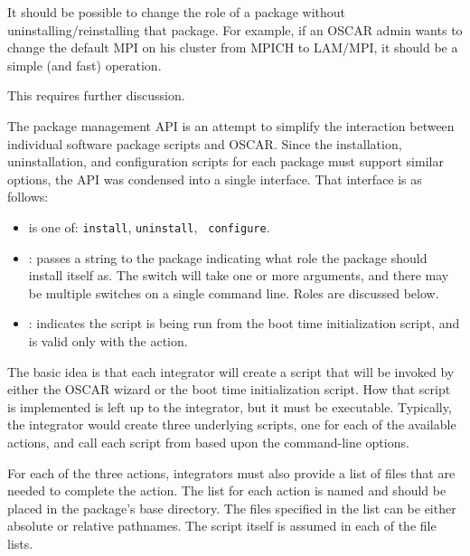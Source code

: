 \begin{discuss}
  It should be possible to change the role of a package without
  uninstalling/reinstalling that package.  For example, if an OSCAR
  admin wants to change the default MPI on his cluster from MPICH to
  LAM/MPI, it should be a simple (and fast) operation.

  This requires further discussion.
\end{discuss}

The package management API is an attempt to simplify the interaction
between individual software package scripts and OSCAR.  Since the
installation, uninstallation, and configuration scripts for each
package must support similar options, the API was condensed into a
single interface. That interface is as follows:


\begin{itemize}
\item {} is one of: {\tt install}, {\tt uninstall}, {\tt
    configure}.
  
\item {}: passes a string to the package indicating what
  role the package should install itself as.  The  switch
  will take one or more arguments, and there may be multiple
   switches on a single command line.  Roles are discussed
  below.
  
\item {}: indicates the script is being run from the boot
  time initialization script, and is valid only with the
   action.
\end{itemize}

The basic idea is that each integrator will create a 
script that will be invoked by either the OSCAR wizard or the boot
time initialization script. How that script is implemented is left up
to the integrator, but it must be executable.  Typically, the
integrator would create three underlying scripts, one for each of the
available actions, and call each script from  based
upon the command-line options.

For each of the three actions, integrators must also provide a list of
files that are needed to complete the action. The list for each action
is named  and should be placed in the
package's base directory. The files specified in the list can be
either absolute or relative pathnames.  The  script
itself is assumed in each of the file lists.

